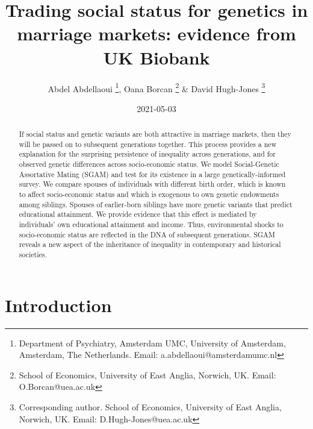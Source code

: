 \documentclass[
]{article}
\title{Trading social status for genetics in marriage markets: evidence from UK Biobank}
\author{Abdel Abdellaoui \thanks{Department of Psychiatry, Amsterdam UMC, University 
of Amsterdam, Amsterdam, The Netherlands. Email: a.abdellaoui@amsterdamumc.nl},
Oana Borcan \thanks{School of Economics, University of East Anglia, Norwich, 
UK. Email: O.Borcan@uea.ac.uk} \&
David Hugh-Jones \thanks{Corresponding author. School of Economics, 
University of East Anglia, Norwich, UK. Email: D.Hugh-Jones@uea.ac.uk}}
\date{2021-05-03}
\begin{document}
\maketitle
\begin{abstract}
If social status and genetic variants are both attractive in marriage markets,
then they will be passed on to subsequent generations together. This process
provides a
new explanation for the surprising persistence of inequality across generations,
and for observed genetic differences across socio-economic status. We model
Social-Genetic Assortative Mating (SGAM) and test for its existence in a large
genetically-informed survey. We compare spouses of individuals with different
birth order, which is known to affect socio-economic status and which is
exogenous to own genetic endowments among siblings. Spouses of
earlier-born siblings have more genetic variants that predict educational
attainment. We provide evidence that this effect is mediated by individuals'
own educational attainment and income. Thus, environmental shocks to
socio-economic status are reflected in the DNA of subsequent generations.
SGAM reveals a new aspect of the inheritance of inequality in contemporary and
historical societies.
\end{abstract}

\normalem

\hypertarget{introduction}{%
\section{Introduction}\label{introduction}}
\end{document}
